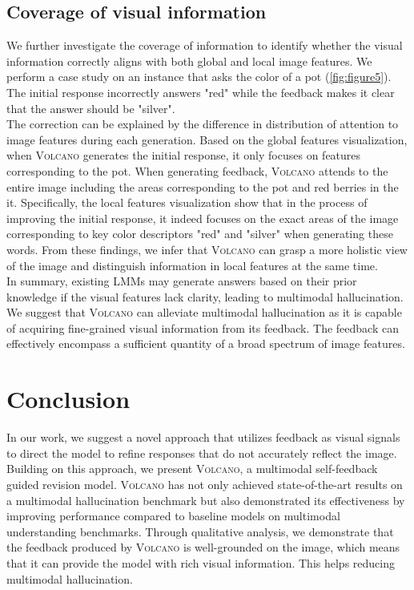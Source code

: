 \documentclass[11pt]{article}
\newcommand{\Ours}{\textsc{Volcano}}
\begin{document}
\subsection{Coverage of visual information}
\label{subsec:coverage}
We further investigate the coverage of information to identify whether the visual information correctly aligns with both global and local image features. We perform a case study on an instance that asks the color of a pot (\autoref{fig:figure5}). The initial response incorrectly answers "red" while the feedback makes it clear that the answer should be "silver". \\
The correction can be explained by the difference in distribution of attention to image features during each generation. 
Based on the global features visualization, when {\Ours} generates the initial response, it only focuses on features corresponding to the pot. When generating feedback, {\Ours} attends to the entire image including the areas corresponding to the pot and red berries in the it. Specifically, the local features visualization show that in the process of improving the initial response, it indeed focuses on the exact areas of the image corresponding to key color descriptors "red" and "silver" when generating these words. From these findings, we infer that {\Ours} can grasp a more holistic view of the image and distinguish information in local features at the same time. \\
In summary, existing LMMs may generate answers based on their prior knowledge if the visual features lack clarity, leading to multimodal hallucination. We suggest that {\Ours} can alleviate multimodal hallucination as it is capable of acquiring fine-grained visual information from its feedback. The feedback can effectively encompass a sufficient quantity of a broad spectrum of image features.
\section{Conclusion}
\label{sec:conclusion}
In our work, we suggest a novel approach that utilizes feedback as visual signals to direct the model to refine responses that do not accurately reflect the image. Building on this approach, we present {\Ours}, a multimodal self-feedback guided revision model. {\Ours} has not only achieved state-of-the-art results on a multimodal hallucination benchmark but also demonstrated its effectiveness by improving performance compared to baseline models on multimodal understanding benchmarks. Through qualitative analysis, we demonstrate that the feedback produced by {\Ours} is well-grounded on the image, which means that it can provide the model with rich visual information. This helps reducing multimodal hallucination.
\end{document}
